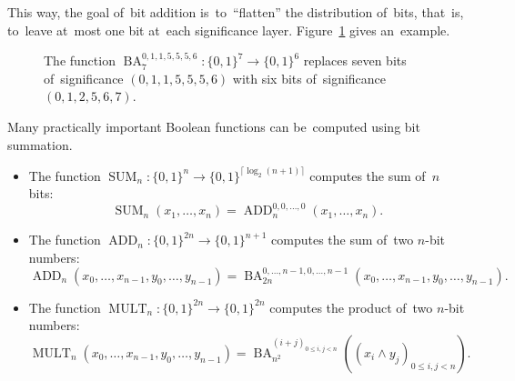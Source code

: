 \documentclass[a4paper, UKenglish, cleveref, autoref,  thm-restate]{lipics-v2021}
\DeclareMathOperator{\SUM}{SUM}
\DeclareMathOperator{\ADD}{ADD}
\DeclareMathOperator{\MULT}{MULT}
\DeclareMathOperator{\BA}{BA}
\begin{document}
    This way, the goal of~bit addition is~to~``flatten''
    the distribution of~bits, that~is, to~leave at~most one bit
    at~each significance layer. Figure~\ref{figure:baexample}
    gives an~example.

    \begin{figure}[ht]
        \begin{center}
        \end{center}
    \caption{The function $\BA_7^{0, 1, 1, 5, 5, 5, 6} \colon \{0,1\}^7 \to \{0,1\}^6$ replaces seven bits of~significance $(0, 1, 1, 5, 5, 5, 6)$ with six bits of~significance $(0, 1, 2, 5, 6, 7)$.}
    \label{figure:baexample}
    \end{figure}




    \color{black}
    Many practically important Boolean functions can be~computed using bit summation.
    \begin{itemize}
        \item The function $\SUM_n \colon \{0,1\}^n \to \{0,1\}^{\lceil \log_2(n+1) \rceil}$
        computes the sum of~$n$ bits: \[\SUM_n(x_1, \dotsc, x_n)=\ADD_n^{0,0,\dotsc,0}(x_1, \dotsc, x_n).\]
        \item The function $\ADD_n \colon \{0,1\}^{2n} \to \{0,1\}^{n+1}$ computes the sum
        of~two $n$-bit numbers:
        \[
            \ADD_n(x_0, \dotsc, x_{n-1}, y_0, \dotsc, y_{n-1})
            =\BA_{2n}^{0,\dotsc,n-1,0,\dotsc,n-1}(x_0, \dotsc, x_{n-1}, y_0, \dotsc, y_{n-1}).
        \]
        \item The function $\MULT_n \colon \{0,1\}^{2n} \to \{0,1\}^{2n}$ computes the product
        of~two $n$-bit numbers:
        \[
            \MULT_n(x_0, \dotsc, x_{n-1}, y_0, \dotsc, y_{n-1})=\BA_{n^2}^{(i+j)_{0 \le i, j < n}}\left(\left(x_i \land y_j\right)_{0 \le i, j < n}\right).
        \]
    \end{itemize}
\end{document}
